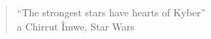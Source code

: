 

\newcommand{\textfield}[2]{
  \vbox{
    \hsize=#1\kern3cm\hrule\kern1ex
    \hbox to \hsize{\strut\hfil\footnotesize#2\hfil}
  }
}




\chapter*{}
\vfill
\begin{quote}
  ``The strongest stars have hearts of \textsf{Kyber}'' \\
  a \hfill \hfill Chirrut Îmwe, Star Wars
\end{quote}
\vfill
\newpage


